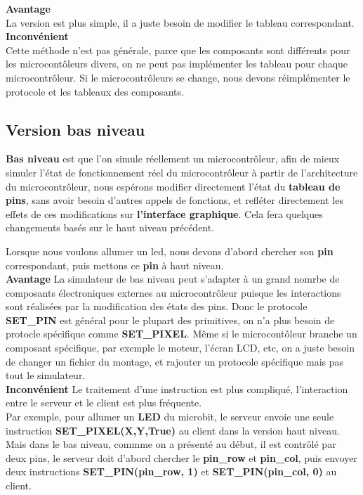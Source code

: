 \documentclass[14px]{article}
\begin{document}
\textbf{Avantage}\\
La version est plus simple, il a juste besoin de modifier le tableau correspondant.\\

\textbf{Inconvénient}\\
Cette méthode n'est pas générale, parce que les composants sont différents pour les microcontôleurs divers, on ne peut pas implémenter les tableau pour chaque microcontrôleur.
Si le microcontrôleurs se change, nous devons réimplémenter le protocole et les tableaux des composants.


\subsection{Version bas niveau}
\textbf{Bas niveau} est que l'on simule réellement un microcontrôleur, afin de mieux simuler l'état de fonctionnement réel du microcontrôleur à partir de l'architecture du microcontrôleur, nous espérons modifier directement l'état du \textbf{tableau de pins}, sans avoir besoin d'autres appels de fonctions, et refléter directement les effets de ces modifications sur \textbf{l'interface graphique}. Cela fera quelques changements basés sur le haut niveau précédent.

Lorsque nous voulons allumer un led, nous devons d'abord chercher son \textbf{pin} correspondant, puis mettons ce \textbf{pin} à haut niveau.\\

\textbf{Avantage}
La simulateur de bas niveau peut s'adapter à un grand nomrbe de composants électroniques externes au microcontrôleur puisque les interactions sont réalisées par la modification des états des pins. Donc le protocole \textbf{SET\_PIN} est général pour le plupart des primitives, on n'a plus besoin de protocle spécifique comme \textbf{SET\_PIXEL}. Même si le microcontôleur branche un composant spécifique, par exemple le moteur, l'écran LCD, etc, on a juste besoin de changer un fichier du montage, et rajouter un protocole spécifique mais pas tout le simulateur.\\

\textbf{Inconvénient}
Le traitement d'une instruction est plus compliqué, l'interaction entre le serveur et le client est plus fréquente.\\
Par exemple, pour allumer un \textbf{LED} du microbit, le serveur envoie une seule instruction \textbf{SET\_PIXEL(X,Y,True)} au client dans la version haut niveau. Mais dans le bas niveau, commme on a présenté au début, il est contrôlé par deux pins, le serveur doit d'abord chercher le \textbf{pin\_row} et \textbf{pin\_col}, puis envoyer deux instructions \textbf{SET\_PIN(pin\_row, 1)} et \textbf{SET\_PIN(pin\_col, 0)} au client.
\end{document}
